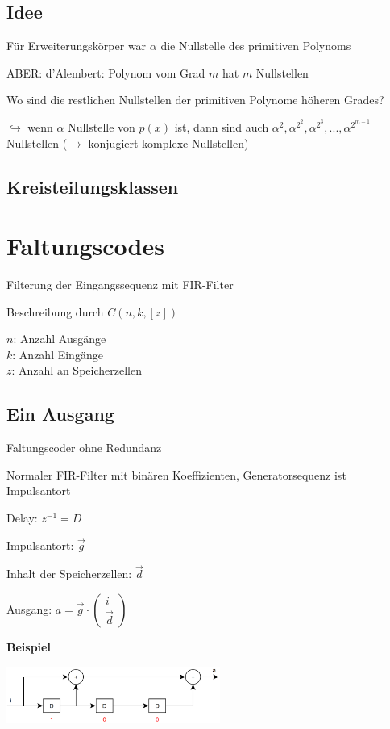 \subsection{Idee}

Für Erweiterungskörper war $\alpha$ die Nullstelle des primitiven Polynoms

ABER: d'Alembert: Polynom vom Grad $m$ hat $m$ Nullstellen

Wo sind die restlichen Nullstellen der primitiven Polynome höheren Grades?

$\hookrightarrow$ wenn $\alpha$ Nullstelle von $p(x)$ ist, dann sind auch $\alpha^2, \alpha^{2^2}, \alpha^{2^3}, ..., \alpha^{2^{m-1}}$
Nullstellen ($\rightarrow$ konjugiert komplexe Nullstellen)

\subsection{Kreisteilungsklassen}

\section{Faltungscodes}

Filterung der Eingangssequenz mit FIR-Filter

Beschreibung durch $C(n, k, [z])$

$n$: Anzahl Ausgänge\\
$k$: Anzahl Eingänge\\
$z$: Anzahl an Speicherzellen

\subsection{Ein Ausgang}

Faltungscoder ohne Redundanz

Normaler FIR-Filter mit binären Koeffizienten, Generatorsequenz ist Impulsantort

Delay: $z^{-1} = D$

Impulsantort: $\vec{g}$

Inhalt der Speicherzellen: $\vec{d}$

Ausgang: $\displaystyle{
    a = \vec{g} \cdot
    \begin{pmatrix}
        i\\
        \vec{d}
    \end{pmatrix}
}$

\textbf{Beispiel}

\includegraphics[width=7cm]{img/faltungscoder1in1out.PNG}

